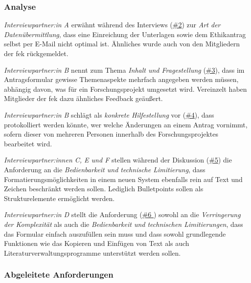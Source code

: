 \documentclass[a4paper,12pt,twoside]{scrreprt}
\begin{document}
\subsubsection*{Analyse}
\label{sub-sub-sec:analyse-während-erstellung-einreichung}

\textit{Interviewpartner:in A} erwähnt während des Interviews (\hyperref[tab:anforderungen-während-erstellung-einreichung]{\#2}) zur \textit{Art der Datenübermittlung}, dass eine Einreichung der Unterlagen sowie dem Ethikantrag selbst per E-Mail nicht optimal ist. Ähnliches wurde auch von den Mitgliedern der \ac{fek} rückgemeldet.

\medskip

\textit{Interviewpartner:in B} nennt zum Thema \textit{Inhalt und Fragestellung} (\hyperref[tab:anforderungen-während-erstellung-einreichung]{\#3}), dass im Antragsformular gewisse Themenaspekte mehrfach angegeben werden müssen, abhängig davon, was für ein Forschungsprojekt umgesetzt wird. Vereinzelt haben Mitglieder der \ac{fek} dazu ähnliches Feedback geäußert.

\medskip

\textit{Interviewpartner:in B} schlägt als \textit{konkrete Hilfestellung} vor (\hyperref[tab:anforderungen-während-erstellung-einreichung]{\#4}), dass protokolliert werden könnte, wer welche Änderungen an einem Antrag vornimmt, sofern dieser von mehreren Personen innerhalb des Forschungsprojektes bearbeitet wird.

\medskip

\textit{Interviewpartner:innen C, E und F} stellen während der Diskussion (\hyperref[tab:anforderungen-während-erstellung-einreichung]{\#5}) die Anforderung an die \textit{Bedienbarkeit und technische Limitierung}, dass Formatierungsmöglichkeiten in einem neuen System ebenfalls rein auf Text und Zeichen beschränkt werden sollen. Lediglich Bulletpoints sollen als Strukturelemente ermöglicht werden.

\medskip

\textit{Interviewpartner:in D} stellt die Anforderung (\hyperref[tab:anforderungen-während-erstellung-einreichung]{\#6 }) sowohl an die \textit{Verringerung der Komplexität} als auch die \textit{Bedienbarkeit und technischen Limitierungen}, dass das Formular einfach auszufüllen sein muss und dass sowohl grundlegende Funktionen wie das Kopieren und Einfügen von Text als auch Literaturverwaltungsprogramme unterstützt werden sollen.

\subsubsection*{Abgeleitete Anforderungen}
\label{sub-sub-sec:abgeleitete-anforderungen-während-erstellung-einreichung}
\end{document}
